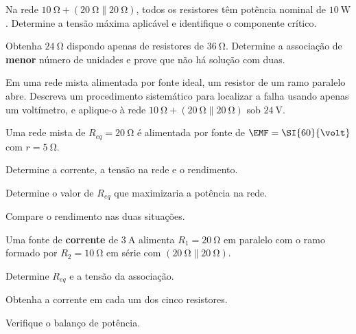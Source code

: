 \begin{questao}[3]{}

Na rede $\SI{10}{\ohm}+(\SI{20}{\ohm}\parallel\SI{20}{\ohm})$, todos os
resistores têm potência nominal de $\SI{10}{\watt}$. Determine a tensão máxima
aplicável e identifique o componente crítico.


\end{questao}
\begin{questao}[3]{}

Obtenha $\SI{24}{\ohm}$ dispondo apenas de resistores de $\SI{36}{\ohm}$.
Determine a associação de \textbf{menor} número de unidades e prove que não há
solução com duas.


\end{questao}
\begin{questao}[3]{}

Em uma rede mista alimentada por fonte ideal, um resistor de um ramo paralelo
abre. Descreva um procedimento sistemático para localizar a falha usando apenas
um voltímetro, e aplique-o à rede
$\SI{10}{\ohm}+(\SI{20}{\ohm}\parallel\SI{20}{\ohm})$ sob $\SI{24}{\volt}$.


\end{questao}
\begin{questao}[3]{}

Uma rede mista de $R_{eq}=\SI{20}{\ohm}$ é alimentada por fonte de
$\EMF=\SI{60}{\volt}$ com $r=\SI{5}{\ohm}$.
\begin{itensq}
\item Determine a corrente, a tensão na rede e o rendimento.
\item Determine o valor de $R_{eq}$ que maximizaria a potência na rede.
\item Compare o rendimento nas duas situações.
\end{itensq}


\end{questao}
\begin{questao}[3]{}

Uma fonte de \textbf{corrente} de $\SI{3}{\ampere}$ alimenta $R_1=\SI{20}{\ohm}$
em paralelo com o ramo formado por $R_2=\SI{10}{\ohm}$ em série com
$(\SI{20}{\ohm}\parallel\SI{20}{\ohm})$.
\begin{itensq}
\item Determine $R_{eq}$ e a tensão da associação.
\item Obtenha a corrente em cada um dos cinco resistores.
\item Verifique o balanço de potência.
\end{itensq}


\end{questao}

